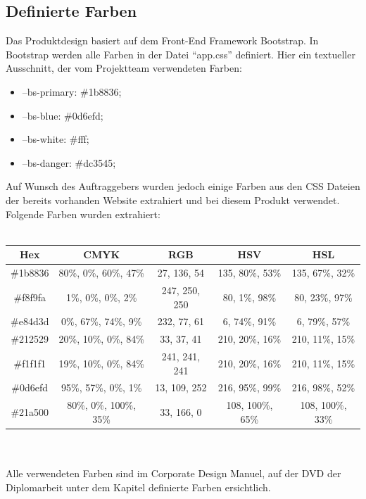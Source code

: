 \subsection{Definierte Farben}
Das Produktdesign basiert auf dem Front-End Framework Bootstrap. In Bootstrap werden alle Farben in der Datei “app.css” definiert. Hier ein textueller Ausschnitt, der vom Projektteam verwendeten Farben:
\\
\begin{itemize}
	\item --bs-primary: \#1b8836;
	\item --bs-blue: \#0d6efd;
	\item --bs-white: \#fff;
	\item --bs-danger: \#dc3545;
\end{itemize}
\newpage
Auf Wunsch des Auftraggebers wurden jedoch einige Farben aus den CSS Dateien der bereits vorhanden Website extrahiert und bei diesem Produkt verwendet. Folgende Farben wurden extrahiert:
\\
\\
\begin{tabular}{|c|c|c|c|c|}
	\hline
	Hex & CMYK & RGB & HSV & HSL \\
	\hline
	\#1b8836 & 80\%, 0\%, 60\%, 47\% & 27, 136, 54 & 135, 80\%, 53\% & 135, 67\%, 32\%  \\
	\hline 
	\#f8f9fa & 1\%, 0\%, 0\%, 2\% & 247, 250, 250 & 80, 1\%, 98\% & 80, 23\%, 97\% \\
	\hline
	\#e84d3d & 0\%, 67\%, 74\%, 9\% & 232, 77, 61 & 6, 74\%, 91\% & 6, 79\%, 57\% \\
	\hline
	\#212529 & 20\%, 10\%, 0\%, 84\% & 33, 37, 41 & 210, 20\%, 16\% & 210, 11\%, 15\% \\
	\hline
	\#f1f1f1 & 19\%, 10\%, 0\%, 84\% & 241, 241, 241 & 210, 20\%, 16\% & 210, 11\%, 15\% \\
	\hline
	\#0d6efd & 95\%, 57\%, 0\%, 1\% & 13, 109, 252 & 216, 95\%, 99\% & 216, 98\%, 52\% \\
	\hline
	\#21a500 & 80\%, 0\%, 100\%, 35\% & 33, 166, 0 & 108, 100\%, 65\% & 108, 100\%, 33\% \\
	\hline
	

\end{tabular}
	\\
\\
Alle verwendeten Farben sind im Corporate Design Manuel, auf der DVD der Diplomarbeit unter dem Kapitel  definierte Farben ersichtlich.

